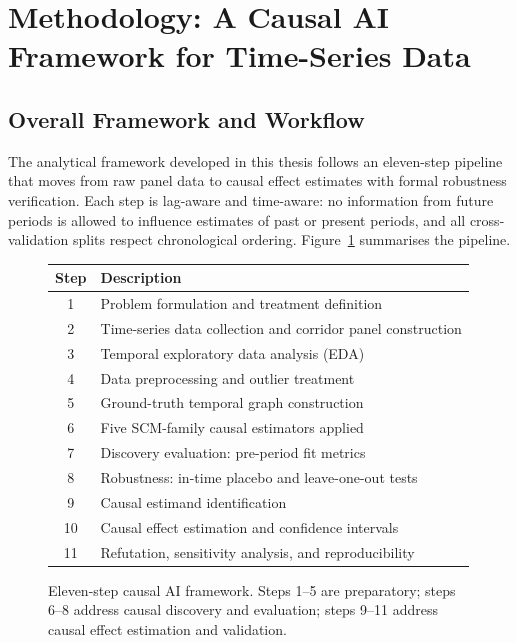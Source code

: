 
\section{Methodology: A Causal AI Framework for Time-Series Data}
\label{sec:methodology}

\subsection{Overall Framework and Workflow}
\label{sec:framework}

The analytical framework developed in this thesis follows an
eleven-step pipeline that moves from raw panel data to causal effect
estimates with formal robustness verification.
Each step is lag-aware and time-aware: no information from future
periods is allowed to influence estimates of past or present periods,
and all cross-validation splits respect chronological ordering.
Figure~\ref{fig:workflow} summarises the pipeline.

\begin{figure}[H]
  \centering
  \renewcommand{\arraystretch}{1.4}
  \begin{tabular}{cl}
    \toprule
    \textbf{Step} & \textbf{Description} \\
    \midrule
    1  & Problem formulation and treatment definition \\
    2  & Time-series data collection and corridor panel construction \\
    3  & Temporal exploratory data analysis (EDA) \\
    4  & Data preprocessing and outlier treatment \\
    5  & Ground-truth temporal graph construction \\
    6  & Five SCM-family causal estimators applied \\
    7  & Discovery evaluation: pre-period fit metrics \\
    8  & Robustness: in-time placebo and leave-one-out tests \\
    9  & Causal estimand identification \\
    10 & Causal effect estimation and confidence intervals \\
    11 & Refutation, sensitivity analysis, and reproducibility \\
    \bottomrule
  \end{tabular}
  \caption{Eleven-step causal AI framework. Steps 1--5 are
    preparatory; steps 6--8 address causal discovery and evaluation;
    steps 9--11 address causal effect estimation and validation.}
  \label{fig:workflow}
\end{figure}

